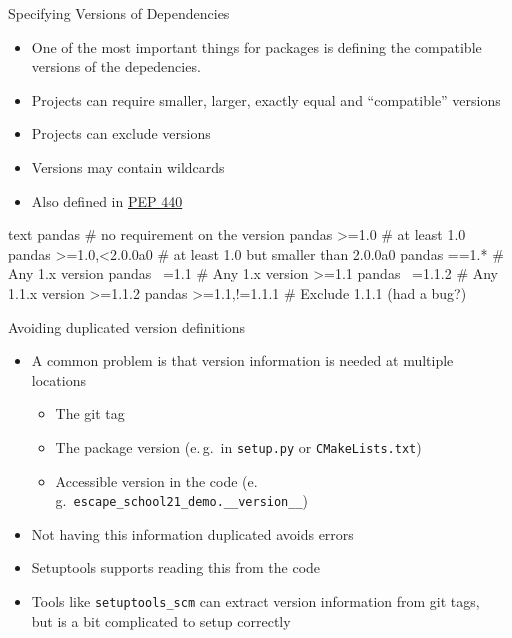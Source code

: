 \documentclass[
  aspectratio=1610,
]{beamer}
\begin{document}
\begin{frame}[fragile, c]{Specifying Versions of Dependencies}
  \begin{itemize}
    \item One of the most important things for packages is defining the compatible versions
  of the depedencies.
    \item Projects can require smaller, larger, exactly equal and \enquote{compatible} versions
    \item Projects can exclude versions
    \item Versions may contain wildcards
    \item Also defined in \href{https://www.python.org/dev/peps/pep-0440/#version-specifiers}{PEP 440}
  \end{itemize}

  \begin{code}[title={Depedency defintions}]{text}
     pandas                 # no requirement on the version
     pandas >=1.0           # at least 1.0
     pandas >=1.0,<2.0.0a0  # at least 1.0 but smaller than 2.0.0a0
     pandas ==1.*           # Any 1.x version
     pandas ~=1.1           # Any 1.x version >=1.1
     pandas ~=1.1.2         # Any 1.1.x version >=1.1.2
     pandas >=1.1,!=1.1.1   # Exclude 1.1.1 (had a bug?)
  \end{code}
\end{frame}

\begin{frame}[fragile, c]{Avoiding duplicated version definitions}
  \begin{itemize}
    \item A common problem is that version information is needed at multiple locations
      \begin{itemize}
        \item The git tag
        \item The package version (e.\,g.\ in \texttt{setup.py} or \texttt{CMakeLists.txt})
        \item Accessible version in the code (e.\,g.\ \texttt{escape_school21_demo.__version__})
      \end{itemize}
    \item Not having this information duplicated avoids errors
    \item Setuptools supports reading this from the code
    \item Tools like \texttt{setuptools\_scm} can extract version information from git tags, \\
      but is a bit complicated to setup correctly
  \end{itemize}
\end{frame}
\end{document}
